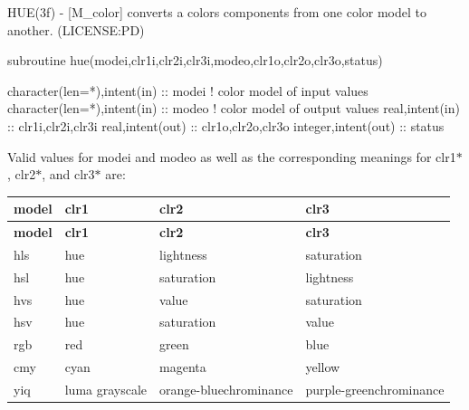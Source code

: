 \begin{DoxyDescription}
\item[\label{_HUE}%
N\+A\+ME ]H\+U\+E(3f) -\/ \mbox{[}M\+\_\+color\mbox{]} converts a color\textquotesingle{}s components from one color model to another. (L\+I\+C\+E\+N\+SE\+:PD) 


\item[S\+Y\+N\+O\+P\+S\+IS ]
\begin{DoxyPre}
 subroutine hue(modei,clr1i,clr2i,clr3i,modeo,clr1o,clr2o,clr3o,status)\end{DoxyPre}



\begin{DoxyPre}  character(len=*),intent(in) :: modei  ! color model of input values
  character(len=*),intent(in) :: modeo  ! color model of output values
  real,intent(in)             :: clr1i,clr2i,clr3i
  real,intent(out)            :: clr1o,clr2o,clr3o
  integer,intent(out)         :: status
 \end{DoxyPre}
 


\item[D\+E\+S\+C\+R\+I\+P\+T\+I\+ON ]
\item[Basic color models ..]

Valid values for modei and modeo as well as the corresponding meanings for clr1$\ast$, clr2$\ast$, and clr3$\ast$ are\+:

\tabulinesep=1mm
\begin{longtabu} spread 0pt [c]{*{4}{|X[-1]}|}
\hline
\rowcolor{\tableheadbgcolor}\textbf{ model}&\textbf{ clr1 }&\textbf{ clr2 }&\textbf{ clr3  }\\
\endfirsthead
\hline
\endfoot
\hline
\rowcolor{\tableheadbgcolor}\textbf{ model}&\textbf{ clr1 }&\textbf{ clr2 }&\textbf{ clr3  }\\
\endhead
hls &hue &lightness &saturation \\
hsl &hue &saturation&lightness  \\
hvs &hue &value &saturation \\
hsv &hue &saturation&value  \\
rgb &red &green &blue  \\
cmy &cyan &magenta &yellow  \\
yiq &luma grayscale &orange-\/bluechrominance &purple-\/greenchrominance  \\
\end{longtabu}






\end{DoxyDescription}
